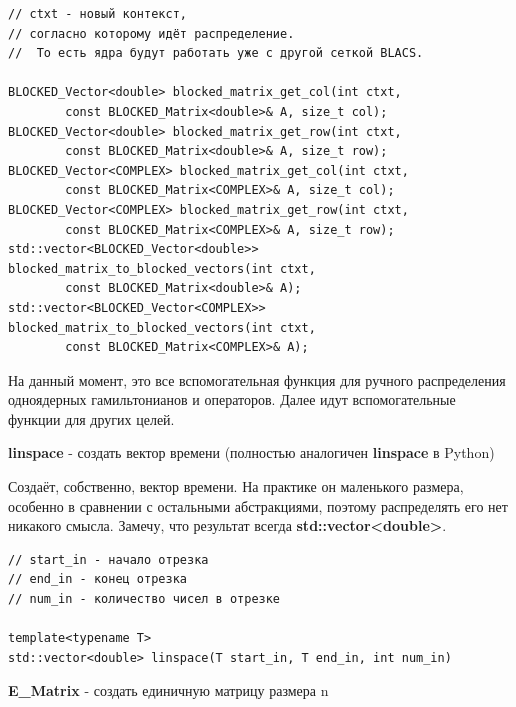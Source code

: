 \documentclass[12pt,fleqn]{article}
\begin{document}
\begin{mdframed}[linecolor=black, topline=true, bottomline=true,
    leftline=false, rightline=false]
\begin{verbatim}
// ctxt - новый контекст, 
// согласно которому идёт распределение.
//  То есть ядра будут работать уже с другой сеткой BLACS.

BLOCKED_Vector<double> blocked_matrix_get_col(int ctxt, 
        const BLOCKED_Matrix<double>& A, size_t col);
BLOCKED_Vector<double> blocked_matrix_get_row(int ctxt, 
        const BLOCKED_Matrix<double>& A, size_t row);
BLOCKED_Vector<COMPLEX> blocked_matrix_get_col(int ctxt, 
        const BLOCKED_Matrix<COMPLEX>& A, size_t col);
BLOCKED_Vector<COMPLEX> blocked_matrix_get_row(int ctxt, 
        const BLOCKED_Matrix<COMPLEX>& A, size_t row);
std::vector<BLOCKED_Vector<double>> blocked_matrix_to_blocked_vectors(int ctxt,
        const BLOCKED_Matrix<double>& A);
std::vector<BLOCKED_Vector<COMPLEX>> blocked_matrix_to_blocked_vectors(int ctxt,
        const BLOCKED_Matrix<COMPLEX>& A);
\end{verbatim}
\end{mdframed}

        На данный момент, это все вспомогательная функция для ручного распределения одноядерных гамильтонианов и операторов. Далее идут вспомогательные функции для других целей.

        \begin{center}\textbf{linspace} - создать вектор времени (полностью аналогичен \textbf{linspace} в Python)\end{center}

        Создаёт, собственно, вектор времени. На практике он маленького размера, особенно в сравнении с остальными абстракциями, поэтому распределять его нет никакого смысла. Замечу,
         что результат всегда \textbf{std::vector<double>}.

\begin{mdframed}[linecolor=black, topline=true, bottomline=true,
    leftline=false, rightline=false]
\begin{verbatim}
// start_in - начало отрезка
// end_in - конец отрезка 
// num_in - количество чисел в отрезке

template<typename T>
std::vector<double> linspace(T start_in, T end_in, int num_in)
    \end{verbatim}
\end{mdframed}

\begin{center}{\textbf{E\_Matrix} - создать единичную матрицу размера n}\end{center}
\end{document}

